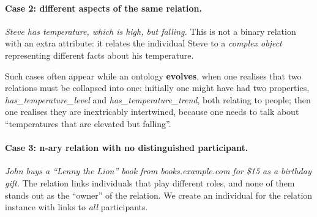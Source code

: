 \paragraph{Case 2: different aspects of the same relation.}
\emph{Steve has temperature, which is high, but falling.} This is not a binary relation
with an extra attribute: it relates the individual Steve to a \emph{complex object}
representing different facts about his temperature.

\begin{center}
\end{center}

Such cases often appear while an ontology \textbf{evolves}, when one realises that two
relations must be collapsed into one: initially one might have had two properties,
\emph{has\_temperature\_level} and \emph{has\_temperature\_trend}, both relating to
people; then one realises they are inextricably intertwined, because one needs to talk
about ``temperatures that are elevated but falling''.

\paragraph{Case 3: n-ary relation with no distinguished participant.}
\emph{John buys a ``Lenny the Lion'' book from books.example.com for \$15 as a birthday
gift.} The relation links individuals that play different roles, and none of them stands
out as the ``owner'' of the relation. We create an individual for the relation instance
with links to \emph{all} participants.

